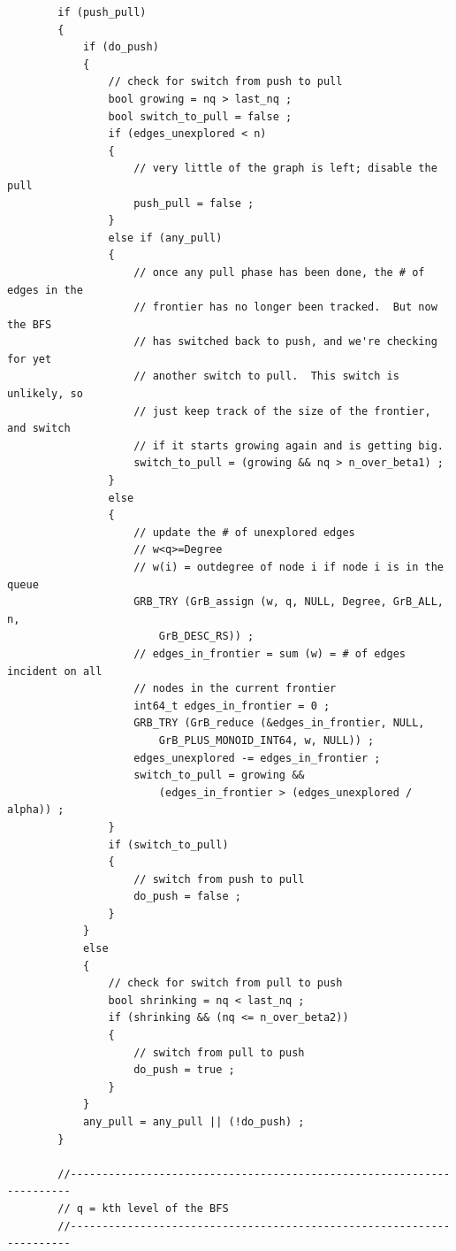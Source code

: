 \begin{verbatim}
        if (push_pull)
        {
            if (do_push)
            {
                // check for switch from push to pull
                bool growing = nq > last_nq ;
                bool switch_to_pull = false ;
                if (edges_unexplored < n)
                {
                    // very little of the graph is left; disable the pull
                    push_pull = false ;
                }
                else if (any_pull)
                {
                    // once any pull phase has been done, the # of edges in the
                    // frontier has no longer been tracked.  But now the BFS
                    // has switched back to push, and we're checking for yet
                    // another switch to pull.  This switch is unlikely, so
                    // just keep track of the size of the frontier, and switch
                    // if it starts growing again and is getting big.
                    switch_to_pull = (growing && nq > n_over_beta1) ;
                }
                else
                {
                    // update the # of unexplored edges
                    // w<q>=Degree
                    // w(i) = outdegree of node i if node i is in the queue
                    GRB_TRY (GrB_assign (w, q, NULL, Degree, GrB_ALL, n,
                        GrB_DESC_RS)) ;
                    // edges_in_frontier = sum (w) = # of edges incident on all
                    // nodes in the current frontier
                    int64_t edges_in_frontier = 0 ;
                    GRB_TRY (GrB_reduce (&edges_in_frontier, NULL,
                        GrB_PLUS_MONOID_INT64, w, NULL)) ;
                    edges_unexplored -= edges_in_frontier ;
                    switch_to_pull = growing &&
                        (edges_in_frontier > (edges_unexplored / alpha)) ;
                }
                if (switch_to_pull)
                {
                    // switch from push to pull
                    do_push = false ;
                }
            }
            else
            {
                // check for switch from pull to push
                bool shrinking = nq < last_nq ;
                if (shrinking && (nq <= n_over_beta2))
                {
                    // switch from pull to push
                    do_push = true ;
                }
            }
            any_pull = any_pull || (!do_push) ;
        }

        //----------------------------------------------------------------------
        // q = kth level of the BFS
        //----------------------------------------------------------------------


\end{verbatim}
